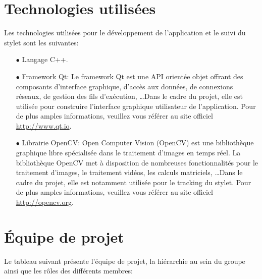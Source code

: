 \documentclass[11pt,a4paper,oldfontcommands]{memoir}
\begin{document}
\section{Technologies utilisées}

Les technologies utilisées pour le développement de l'application et le suivi du stylet sont les suivantes:

\begin{itemize}
\item[$\bullet$] Langage C++.
\item[$\bullet$] Framework Qt: Le framework Qt est une API orientée objet offrant des composants d'interface graphique, d'accès aux données, de connexions réseaux, de gestion des fils d'exécution, \dots Dans le cadre du projet, elle est utilisée pour construire l'interface graphique utilisateur de l'application. Pour de plus amples informations, veuillez vous référer au site officiel \url{http://www.qt.io}.
\item[$\bullet$] Librairie OpenCV: Open Computer Vision (OpenCV) est une bibliothèque graphique libre spécialisée dans le traitement d'images en temps réel. La bibliothèque OpenCV met à disposition de nombreuses fonctionnalités pour le traitement d'images, le traitement vidéos, les calculs matriciels, \dots Dans le cadre du projet, elle est notamment utilisée pour le tracking du stylet. Pour de plus amples informations, veuillez vous référer au site officiel \url{http://opencv.org}.
\end{itemize}

\section{Équipe de projet}

Le tableau suivant présente l'équipe de projet, la hiérarchie au sein du groupe ainsi que les rôles des différents membres:
\end{document}
